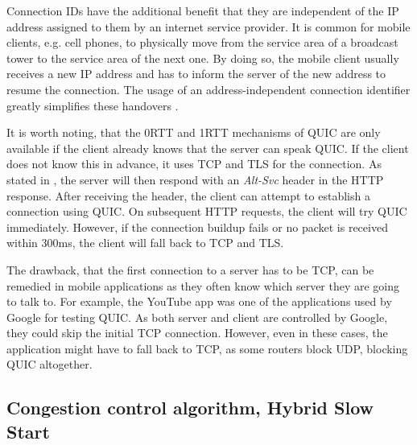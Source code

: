\documentclass[conference]{IEEEtran}
\begin{document}
Connection IDs have the additional benefit that they are independent of the IP address assigned to them by an internet service provider. It is common for mobile clients, e.g. cell phones, to physically move from the service area of a broadcast tower to the service area of the next one. By doing so, the mobile client usually receives a new IP address and has to inform the server of the new address to resume the connection. The usage of an address-independent connection identifier greatly simplifies these handovers \cite{HowQuickIsQuic}.

It is worth noting, that the 0RTT and 1RTT mechanisms of QUIC are only available if the client already knows that the server can speak QUIC. If the client does not know this in advance, it uses TCP and TLS for the connection. As stated in \cite{Google}, the server will then respond with an \textit{Alt-Svc} header in the HTTP response. After receiving the header, the client can attempt to establish a connection using QUIC. On subsequent HTTP requests, the client will try QUIC immediately. However, if the connection buildup fails or no packet is received within 300ms, the client will fall back to TCP and TLS.

The drawback, that the first connection to a server has to be TCP, can be remedied in mobile applications as they often know which server they are going to talk to. For example, the YouTube app was one of the applications used by Google for testing QUIC. As both server and client are controlled by Google, they could skip the initial TCP connection. However, even in these cases, the application might have to fall back to TCP, as some routers block UDP, blocking QUIC altogether.

\subsection{Congestion control algorithm, Hybrid Slow Start}
\end{document}
